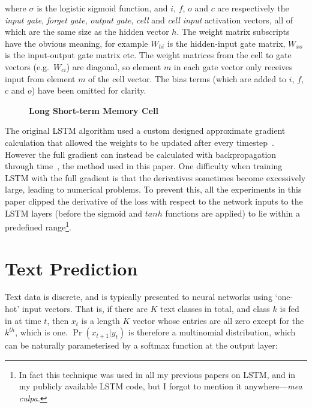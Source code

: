 where $\sigma$ is the logistic sigmoid function, and $i$, $f$, $o$ and $c$ are respectively the \emph{input gate}, \emph{forget gate}, \emph{output gate}, \emph{cell} and \emph{cell input} activation vectors, all of which are the same size as the hidden vector $h$. The weight matrix subscripts have the obvious meaning, for example $W_{h i}$ is the hidden-input gate matrix, $W_{x o}$ is the input-output gate matrix etc. The weight matrices from the cell to gate vectors (e.g.\ $W_{c i}$) are diagonal, so element $m$ in each gate vector only receives input from element $m$ of the cell vector. The bias terms (which are added to $i$, $f$, $c$ and $o$) have been omitted for clarity.

\begin{figure}
\begin{center}

\end{center}
\caption[Long Short-term Memory Cell]{\textbf{Long Short-term Memory Cell}}
\label{fig:lstm}
\end{figure}

The original LSTM algorithm used a custom designed approximate gradient calculation that allowed the weights to be updated after every timestep~\cite{hochreiter97lstm}. However the full gradient can instead be calculated with backpropagation through time~\cite{graves05nn}, the method used in this paper. One difficulty when training LSTM with the full gradient is that the derivatives sometimes become excessively large, leading to numerical problems. To prevent this, all the experiments in this paper clipped the derivative of the loss with respect to the network inputs to the LSTM layers (before the sigmoid and $tanh$ functions are applied) to lie within a predefined range\footnote{In fact this technique was used in all my previous papers on LSTM, and in my publicly available LSTM code, but I forgot to mention it anywhere---\emph{mea culpa}.}.

\section{Text Prediction}
\label{sec:text}
Text data is discrete, and is typically presented to neural networks using `one-hot' input vectors. That is, if there are $K$ text classes in total, and class $k$ is fed in at time $t$, then $x_t$ is a length $K$ vector whose entries are all zero except for the $k^{th}$, which is one.
$\Pr(x_{t+1}|y_t)$ is therefore a multinomial distribution, which can be naturally parameterised by a softmax function at the output layer:

